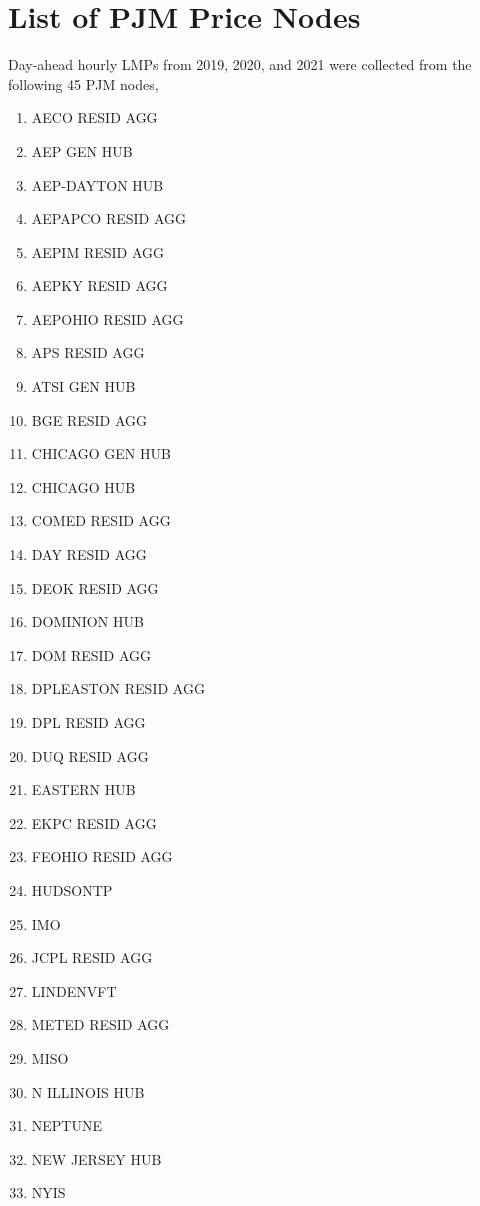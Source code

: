 \chapter{List of PJM Price Nodes}\label{ch:list-of-pjm-price-nodes}

Day-ahead hourly LMPs from 2019, 2020, and 2021 were collected from the following 45 PJM nodes,

\begin{multicols}{2}
{\footnotesize
\begin{enumerate}
    \item AECO RESID AGG
    \item AEP GEN HUB
    \item AEP-DAYTON HUB
    \item AEPAPCO RESID AGG
    \item AEPIM RESID AGG
    \item AEPKY RESID AGG
    \item AEPOHIO RESID AGG
    \item APS RESID AGG
    \item ATSI GEN HUB
    \item BGE RESID AGG
    \item CHICAGO GEN HUB
    \item CHICAGO HUB
    \item COMED RESID AGG
    \item DAY RESID AGG
    \item DEOK RESID AGG
    \item DOMINION HUB
    \item DOM RESID AGG
    \item DPLEASTON RESID AGG
    \item DPL RESID AGG
    \item DUQ RESID AGG
    \item EASTERN HUB
    \item EKPC RESID AGG
    \item FEOHIO RESID AGG
    \item HUDSONTP
    \item IMO
    \item JCPL RESID AGG
    \item LINDENVFT
    \item METED RESID AGG
    \item MISO
    \item N ILLINOIS HUB
    \item NEPTUNE
    \item NEW JERSEY HUB
    \item NYIS

\end{enumerate}}
\end{multicols}
